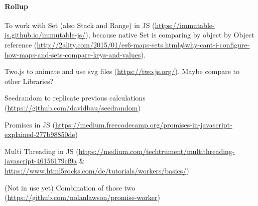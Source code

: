 \paragraph{Rollup}

To work with Set (also Stack and Range) in JS (\url{https://immutable-js.github.io/immutable-js/}), because native Set is comparing by object by Object reference (\url{http://2ality.com/2015/01/es6-maps-sets.html#why-cant-i-configure-how-maps-and-sets-compare-keys-and-values}).

Two.js to animate and use svg files (\url{https://two.js.org/}). Maybe compare to other Libraries?

Seedrandom to replicate previous calculations (\url{https://github.com/davidbau/seedrandom})

Promises in JS (\url{https://medium.freecodecamp.org/promises-in-javascript-explained-277b98850de})

Multi Threading in JS (\url{https://medium.com/techtrument/multithreading-javascript-46156179cf9a} \& \url{https://www.html5rocks.com/de/tutorials/workers/basics/})

(Not in use yet) Combination of those two (\url{https://github.com/nolanlawson/promise-worker})